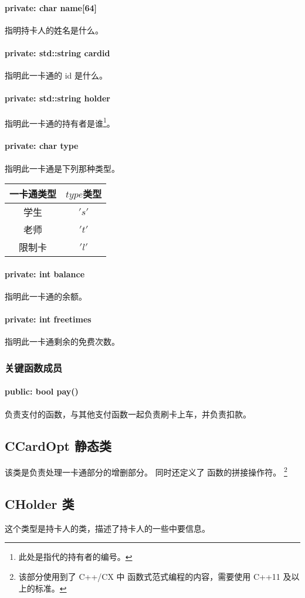\documentclass{ctexart}
\begin{document}
    \paragraph{private: char name[64]}
    指明持卡人的姓名是什么。
    \paragraph{private: std::string cardid}
    指明此一卡通的 id 是什么。
    \paragraph{private: std::string holder}
    指明此一卡通的持有者是谁\footnote{此处是指代的持有者的编号。}。
    \paragraph{private: char type}
    指明此一卡通是下列那种类型。
    \begin{flushleft}
        \begin{tabular}{|c|c|}
            \hline 一卡通类型 & $type$类型 \\ 
            \hline 学生 & $'s'$ \\ 
            \hline 老师 & $'t'$ \\ 
            \hline 限制卡 & $'l'$ \\ 
            \hline 
        \end{tabular} 
    \end{flushleft}
    \paragraph{private: int balance}
    指明此一卡通的余额。
    \paragraph{private: int freetimes}
    指明此一卡通剩余的免费次数。
    \subsubsection{关键函数成员}
    \paragraph{public: bool pay()}
    负责支付的函数，与其他支付函数一起负责刷卡上车，并负责扣款。
    \subsection{CCardOpt 静态类}
    该类是负责处理一卡通部分的增删部分。
    同时还定义了 函数的拼接操作符。
    \footnote{该部分使用到了 C++/CX 中 函数式范式编程的内容，需要使用 C++11 及以上的标准。}
    \subsection{CHolder 类}
    这个类型是持卡人的类，描述了持卡人的一些中要信息。
    
\end{document}
